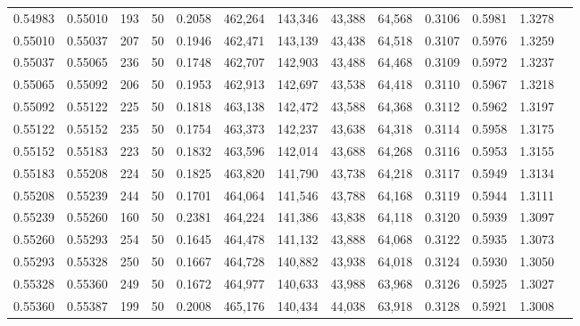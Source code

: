 \begin{tabular}{rrrrrrrrrrrrr}
0.54983 & 0.55010 &   193 &  50 &                                     0.2058 & 462,264 & 143,346 &  43,388 &  64,568 & 0.3106 & 0.5981 & 1.3278 \\
0.55010 & 0.55037 &   207 &  50 &                                     0.1946 & 462,471 & 143,139 &  43,438 &  64,518 & 0.3107 & 0.5976 & 1.3259 \\
0.55037 & 0.55065 &   236 &  50 &                                     0.1748 & 462,707 & 142,903 &  43,488 &  64,468 & 0.3109 & 0.5972 & 1.3237 \\
0.55065 & 0.55092 &   206 &  50 &                                     0.1953 & 462,913 & 142,697 &  43,538 &  64,418 & 0.3110 & 0.5967 & 1.3218 \\
0.55092 & 0.55122 &   225 &  50 &                                     0.1818 & 463,138 & 142,472 &  43,588 &  64,368 & 0.3112 & 0.5962 & 1.3197 \\
0.55122 & 0.55152 &   235 &  50 &                                     0.1754 & 463,373 & 142,237 &  43,638 &  64,318 & 0.3114 & 0.5958 & 1.3175 \\
0.55152 & 0.55183 &   223 &  50 &                                     0.1832 & 463,596 & 142,014 &  43,688 &  64,268 & 0.3116 & 0.5953 & 1.3155 \\
0.55183 & 0.55208 &   224 &  50 &                                     0.1825 & 463,820 & 141,790 &  43,738 &  64,218 & 0.3117 & 0.5949 & 1.3134 \\
0.55208 & 0.55239 &   244 &  50 &                                     0.1701 & 464,064 & 141,546 &  43,788 &  64,168 & 0.3119 & 0.5944 & 1.3111 \\
0.55239 & 0.55260 &   160 &  50 &                                     0.2381 & 464,224 & 141,386 &  43,838 &  64,118 & 0.3120 & 0.5939 & 1.3097 \\
0.55260 & 0.55293 &   254 &  50 &                                     0.1645 & 464,478 & 141,132 &  43,888 &  64,068 & 0.3122 & 0.5935 & 1.3073 \\
0.55293 & 0.55328 &   250 &  50 &                                     0.1667 & 464,728 & 140,882 &  43,938 &  64,018 & 0.3124 & 0.5930 & 1.3050 \\
0.55328 & 0.55360 &   249 &  50 &                                     0.1672 & 464,977 & 140,633 &  43,988 &  63,968 & 0.3126 & 0.5925 & 1.3027 \\
0.55360 & 0.55387 &   199 &  50 &                                     0.2008 & 465,176 & 140,434 &  44,038 &  63,918 & 0.3128 & 0.5921 & 1.3008 \\

\end{tabular}
